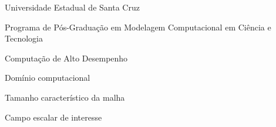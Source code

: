\begin{siglas}\item[UESC] Universidade Estadual de Santa Cruz\item[PPGMC] Programa de Pós-Graduação em Modelagem Computacional em Ciência e Tecnologia\item[HPC] Computação de Alto Desempenho\end{siglas}
\begin{simbolos}\item[$\Omega$] Domínio computacional\item[$h$] Tamanho característico da malha\item[$\phi$] Campo escalar de interesse\end{simbolos}

